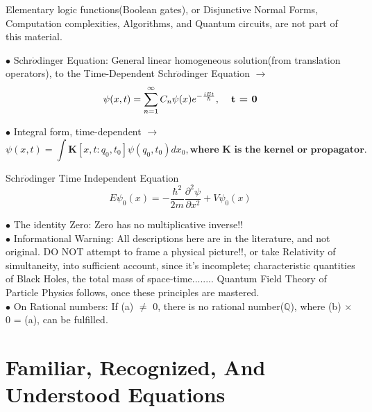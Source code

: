 \documentclass[a4paper, 10pt, onepage]{elegantbook}
\begin{document}
\begin{note}

Elementary logic functions(Boolean gates), or Disjunctive Normal Forms, Computation complexities, Algorithms, and Quantum circuits, are not part of this material.

$\bullet$ Schr$\ddot{o}$dinger Equation: General linear homogeneous solution(from translation operators), to the Time-Dependent Schr$\ddot{o}$dinger Equation $\longrightarrow$ \\

\begin{equation}
\psi(x,t) = \sum_{n = 1}^\infty C_n \psi(x) e^{- \frac{i E t}{\hbar}}, \mathbf{\textbf{\quad t = 0}}
\end{equation}

$\bullet$ Integral form, time-dependent $\longrightarrow$  \\
\begin{equation}
\psi(x,t) = \int \mathbf K[x,t:q_0,t_0]\psi(q_0,t_0)dx_0, \mathbf{\textbf{where K is the kernel or propagator}}.
\end{equation}

Schr$\ddot{o}$dinger Time Independent Equation  \\
\begin{equation}
\boxed{E \psi_0 (x) = - \frac{\hbar^2}{2m} \frac{\partial^2 \psi}{\partial x^2}  + V \psi_0 (x)}
\end{equation}


$\bullet$ The identity Zero: Zero has no multiplicative inverse!!  \\

$\bullet$ Informational Warning: All descriptions here are in the literature, and not original. DO NOT attempt to frame a physical picture!!, or take Relativity of simultaneity, into sufficient account, since it's incomplete; characteristic quantities of Black Holes, the total mass of space-time........ Quantum Field Theory of Particle Physics follows, once these principles are mastered. \\

$\bullet$ On Rational numbers: If (a) $\neq$ 0, there is no rational number($\mathbb Q$), where (b) $\times$ 0 = (a), can be fulfilled.



\chapter{\textbf{Familiar, Recognized, And Understood Equations}}
\label{ch:Familiar, recognized, and understood equations}


\end{note}
\end{document}
